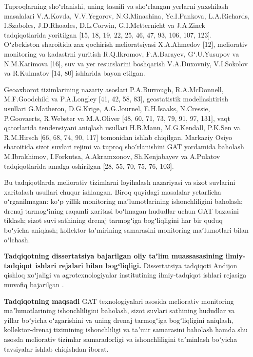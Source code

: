 Tuproqlarning shoʻrlanishi, uning tasnifi va shoʻrlangan yerlarni
yaxshilash masalalari V.A.Kovda, V.V.Yegorov, N.G.Minashina,
Ye.I.Pankova, L.A.Richards, I.Szabolcs, J.D.Rhoades, D.L.Corwin,
G.I.Metternicht va J.A.Zinck tadqiqotlarida yoritilgan {[}15, 18, 19,
22, 25, 46, 47, 93, 106, 107, 123{]}. Oʻzbekiston sharoitida zax
qochirish melioratsiyasi X.A.Ahmedov {[}12{]}, meliorativ monitoring va
kadastrni yuritish R.Q.Ikromov, F.A.Barayev, Gʻ.U.Yusupov va
N.M.Karimova {[}16{]}, suv va yer resurslarini boshqarish V.A.Duxovniy,
V.I.Sokolov va R.Kulmatov {[}14, 80{]} ishlarida bayon etilgan.

Geoaxborot tizimlarining nazariy asoslari P.A.Burrough, R.A.McDonnell,
M.F.Goodchild va P.A.Longley {[}41, 42, 58, 83{]}, geostatistik
modellashtirish usullari G.Matheron, D.G.Krige, A.G.Journel, E.H.Isaaks,
N.Cressie, P.Goovaerts, R.Webster va M.A.Oliver {[}48, 60, 71, 73, 79,
91, 97, 131{]}, vaqt qatorlarida tendensiyani aniqlash usullari
H.B.Mann, M.G.Kendall, P.K.Sen va R.M.Hirsch {[}66, 68, 74, 90, 117{]}
tomonidan ishlab chiqilgan. Markaziy Osiyo sharoitida sizot suvlari
rejimi va tuproq shoʻrlanishini GAT yordamida baholash M.Ibrakhimov,
I.Forkutsa, A.Akramxonov, Sh.Kenjabayev va A.Pulatov tadqiqotlarida
amalga oshirilgan {[}28, 55, 70, 75, 76, 103{]}.

Bu tadqiqotlarda meliorativ tizimlarni loyihalash nazariyasi va sizot
suvlarini xaritalash usullari chuqur ishlangan. Biroq quyidagi masalalar
yetarlicha oʻrganilmagan: koʻp yillik monitoring maʼlumotlarining
ishonchliligini baholash; drenaj tarmogʻining raqamli xaritasi boʻlmagan
hududlar uchun GAT bazasini tiklash; sizot suvi sathining drenaj
tarmogʻiga bogʻliqligini har bir quduq boʻyicha aniqlash; kollektor
taʼmirining samarasini monitoring maʼlumotlari bilan oʻlchash.

\textbf{Tadqiqotning dissertatsiya bajarilgan oliy taʼlim muassasasining
ilmiy-tadqiqot ishlari rejalari bilan bogʻliqligi.} Dissertatsiya
tadqiqoti Andijon qishloq xoʻjaligi va agrotexnologiyalar institutining
ilmiy-tadqiqot ishlari rejasiga muvofiq bajarilgan \toldir{{[}mavzu}
   
   \toldir{kiritiladi{]}}.

\textbf{Tadqiqotning maqsadi} GAT texnologiyalari asosida meliorativ
monitoring maʼlumotlarining ishonchliligini baholash, sizot suvlari
sathining hududlar va yillar boʻyicha oʻzgarishini va uning drenaj
tarmogʻiga bogʻliqligini aniqlash, kollektor-drenaj tizimining
ishonchliligi va taʼmir samarasini baholash hamda shu asosda meliorativ
tizimlar samaradorligi va ishonchliligini taʼminlash boʻyicha tavsiyalar
ishlab chiqishdan iborat.

